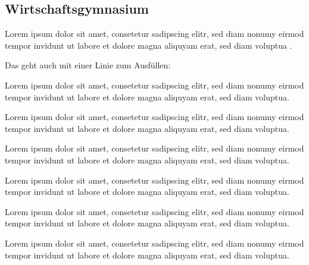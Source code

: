 \documentclass[
parindent=false,
parskip=true,
parts=true,
colortheme=wu,
styletheme=wu,
shownotess=true,
showresults=true
]{edu}
\begin{document}
\newpage

\subsection{Wirtschaftsgymnasium}


\label{testlabel}

Lorem ipsum dolor sit amet, consetetur sadipscing elitr, sed diam nonumy eirmod tempor invidunt ut labore et dolore magna aliquyam erat, sed diam voluptua .


Das geht auch mit einer Linie zum Ausfüllen:


\begin{definition}[Monotonie]
	Lorem ipsum dolor sit amet, consetetur sadipscing elitr, sed diam nonumy eirmod tempor invidunt ut labore et dolore magna aliquyam erat, sed diam voluptua.
\end{definition}

	Lorem ipsum dolor sit amet, consetetur sadipscing elitr, sed diam nonumy eirmod tempor invidunt ut labore et dolore magna aliquyam erat, sed diam voluptua.

\begin{example}
	Lorem ipsum dolor sit amet, consetetur sadipscing elitr, sed diam nonumy eirmod tempor invidunt ut labore et dolore magna aliquyam erat, sed diam voluptua.
\end{example}

\begin{examplef}
	Lorem ipsum dolor sit amet, consetetur sadipscing elitr, sed diam nonumy eirmod tempor invidunt ut labore et dolore magna aliquyam erat, sed diam voluptua.
\end{examplef}

\begin{exampleexe}
	Lorem ipsum dolor sit amet, consetetur sadipscing elitr, sed diam nonumy eirmod tempor invidunt ut labore et dolore magna aliquyam erat, sed diam voluptua.
\end{exampleexe}

\begin{exampleexef}
	Lorem ipsum dolor sit amet, consetetur sadipscing elitr, sed diam nonumy eirmod tempor invidunt ut labore et dolore magna aliquyam erat, sed diam voluptua.
\end{exampleexef}
\end{document}
